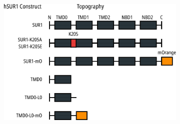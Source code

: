 \begin{figure}[h]
\begin{subfigure}[t]{0.45\textwidth}
		\includegraphics[width=\textwidth]{sur_constructs.pdf}
	\end{subfigure}
	\caption[hKir6.2 and hSUR1 constructs and their abbreviations]{
	}\label{ch0fig:constructs}
\end{figure}